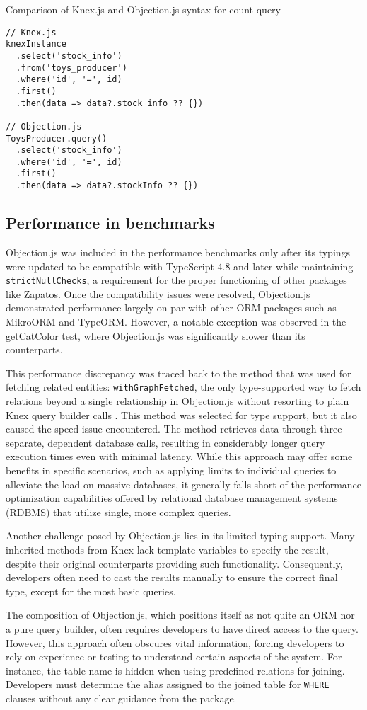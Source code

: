 \begin{listing}
\caption{Comparison of Knex.js and Objection.js syntax for count query}
\label{lst:knexObjection}
\begin{verbatim}
// Knex.js
knexInstance
  .select('stock_info')
  .from('toys_producer')
  .where('id', '=', id)
  .first()
  .then(data => data?.stock_info ?? {})

// Objection.js
ToysProducer.query()
  .select('stock_info')
  .where('id', '=', id)
  .first()
  .then(data => data?.stockInfo ?? {})
\end{verbatim}
\end{listing}

\subsection*{Performance in benchmarks}

Objection.js was included in the performance benchmarks only after its typings
were updated to be compatible with TypeScript 4.8 and later while maintaining
\texttt{strictNullChecks}, a requirement for the proper functioning of other
packages like Zapatos. Once the compatibility issues were resolved, Objection.js
demonstrated performance largely on par with other ORM packages such as MikroORM
and TypeORM. However, a notable exception was observed in the getCatColor test,
where Objection.js was significantly slower than its counterparts.

This performance discrepancy was traced back to the method that was used for
fetching related entities: \texttt{withGraphFetched}, the only type-supported
way to fetch relations beyond a single relationship in Objection.js without
resorting to plain Knex query builder calls \cite{objectionDocs}. This method
was selected for type support, but it also caused the speed issue encountered.
The method retrieves data through three separate, dependent database calls,
resulting in considerably longer query execution times even with minimal
latency. While this approach may offer some benefits in specific scenarios, such
as applying limits to individual queries to alleviate the load on massive
databases, it generally falls short of the performance optimization capabilities
offered by relational database management systems (RDBMS) that utilize single,
more complex queries.

Another challenge posed by Objection.js lies in its limited typing support. Many
inherited methods from Knex lack template variables to specify the result,
despite their original counterparts providing such functionality. Consequently,
developers often need to cast the results manually to ensure the correct final
type, except for the most basic queries.

The composition of Objection.js, which positions itself as not quite an ORM nor
a pure query builder, often requires developers to have direct access to the
query. However, this approach often obscures vital information, forcing
developers to rely on experience or testing to understand certain aspects of the
system. For instance, the table name is hidden when using predefined relations
for joining. Developers must determine the alias assigned to the joined table
for \texttt{WHERE} clauses without any clear guidance from the package.
